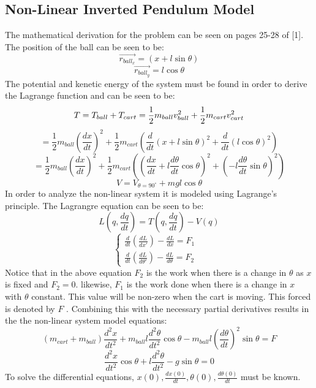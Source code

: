 \documentclass[12pt]{article} %
\begin{document}
\subsection{Non-Linear Inverted Pendulum Model}
The mathematical derivation for the problem can be seen on pages 25-28 of [1]. The position of the ball can be seen to be:
\begin{equation} 
\vec{r_{ball_{x}}} = (x + l\sin\theta)
\end{equation}
\begin{equation} 
\vec{r_{ball_{y}}} =  l\cos\theta  
\end{equation}
The potential and kenetic energy of the system must be found in order to derive the Lagrange function and can be seen to be:
\begin{equation}
T = T_{ball} + T_{cart} = \frac{1}{2}m_{ball}v_{ball}^2 + \frac{1}{2}m_{cart}v_{cart}^2 \\\\
\end{equation}
\begin{equation}
=  \frac{1}{2}m_{ball}(\frac{dx}{dt})^2 + \frac{1}{2}m_{cart}(\frac{d}{dt}(x+l\sin\theta)^2 + \frac{d}{dt}(l\cos\theta)^2 )
\end{equation}
\begin{equation}
=  \frac{1}{2}m_{ball}(\frac{dx}{dt})^2 + \frac{1}{2}m_{cart}((\frac{dx}{dt}+l\frac{d\theta}{dt}\cos\theta)^2 + (-l\frac{d\theta}{dt}\sin\theta)^2 )
\end{equation}
\begin{equation}
V = V_{\theta=90^{\circ}} + mgl\cos\theta
\end{equation}
In order to analyze the non-linear system it is modeled using Lagrange's principle. The Lagrangre equation can be seen to be:
\begin{equation}
L(q, \frac{dq}{dt}) = T(q, \frac{dq}{dt}) - V(q) 
\end{equation}
\begin{equation}
\begin{cases}
\frac{d}{dt}(\frac{dL}{dx'}) - \frac{dL}{dx} = F_1 & \\
\frac{d}{dt}(\frac{dL}{d\theta'}) - \frac{dL}{d\theta} = F_2 &
\end{cases}
\end{equation}
Notice that in the above equation $F_2$ is the work when there is a change in $\theta$ as $x$ is fixed and $F_2 = 0$. likewise, $F_1$ is the work done when there is a change in $x$ with $\theta$ constant. This value will be non-zero when the cart is moving. This forced is denoted by $F$ . Combining this with the necessary partial derivatives results in the the non-linear system model equations:
\begin{equation} \label{eq:nonlin1}
(m_{cart} + m_{ball})\frac{d^2x}{dt^2} + m_{ball}l\frac{d^2\theta}{dt^2}\cos\theta - m_{ball}l(\frac{d\theta}{dt})^2\sin\theta = F
\end{equation}
\begin{equation} \label{eq:nonlin2}
\frac{d^2x}{dt^2}\cos\theta + l\frac{d^2\theta}{dt^2} - g\sin\theta = 0
\end{equation}
To solve the differential equations, $x(0), \frac{dx(0)}{dt}, \theta(0), \frac{d\theta(0)}{dt}$ must be known.
\end{document}
